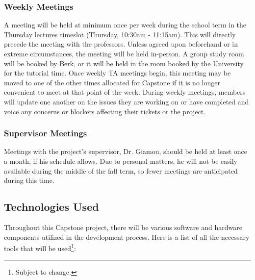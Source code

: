 \documentclass[11pt]{article}
\begin{document}
		\subsubsection{Weekly Meetings}
			A meeting will be held at minimum once per week during the school term in the Thursday lectures timeslot (Thursday, 10:30am - 11:15am). This will directly precede the meeting with the professors. Unless agreed upon beforehand or in extreme circumstances, the meeting will be held in-person. A group study room will be booked by Berk, or it will be held in the room booked by the University for the tutorial time. Once weekly TA meetings begin, this meeting may be moved to one of the other times allocated for Capstone if it is no longer convenient to meet at that point of the week. During weekly meetings, members will update one another on the issues they are working on or have completed and voice any concerns or blockers affecting their tickets or the project.
		\subsubsection{Supervisor Meetings}
			Meetings with the project’s supervisor, Dr. Giamou, should be held at least once a month, if his schedule allows. Due to personal matters, he will not be easily available during the middle of the fall term, so fewer meetings are anticipated during this time. 
		\subsection{Technologies Used} %
			Throughout this Capstone project, there will be various software and hardware components utilized in the development process. Here is a list of all the necessary tools that will be used\footnote{Subject to change.}: 
			
\end{document}
